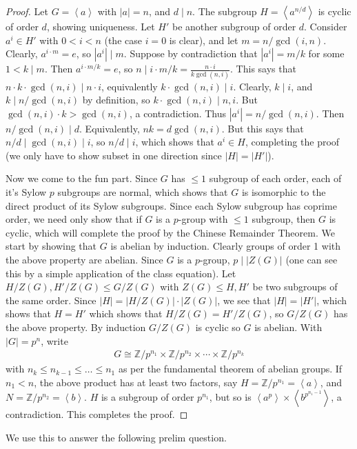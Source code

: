 \documentclass[12pt]{article}
\theoremstyle{definitionstyle}
\def\mbb#1{\mathbb{#1}}
\newcommand{\Z}{\mbb Z}
\newcommand{\gen}[1]{\left\langle #1 \right\rangle}
\begin{document}
	\begin{proof}
		Let $G = \gen{a}$ with $|a| = n$, and $d \mid n$. The subgroup $H = \gen{a^{n/d}}$ is cyclic of order $d$, showing uniqueness. Let $H'$ be another subgroup of order $d$. Consider $a^i \in H'$ with $0 < i < n$ (the case $i=0$ is clear), and let $m = n/\gcd(i,n)$. Clearly, $a^{i \cdot m} = e$, so $|a^i| \mid m$. Suppose by contradiction that $|a^i| = m/k$ for some $1 < k \mid m$. Then $a^{i \cdot m/k} = e$, so $n \mid i \cdot m/k = \frac{n \cdot i}{k \gcd(n, i)}$. This says that $n \cdot k \cdot \gcd(n, i) \mid n \cdot i$, equivalently $k \cdot \gcd(n, i) \mid i$. Clearly, $k \mid i$, and $k \mid n/\gcd(n, i)$ by definition, so $k \cdot \gcd(n, i) \mid n, i$. But $\gcd(n, i) \cdot k > \gcd(n, i)$, a contradiction. Thus $|a^i| = n/\gcd(n, i)$. Then $n/\gcd(n, i) \mid d$. Equivalently, $nk = d\gcd(n, i)$. But this says that $n/d \mid \gcd(n, i) \mid i$, so $n/d \mid i$, which shows that $a^i \in H$, completing the proof (we only have to show subset in one direction since $|H| = |H'|$).
		
		Now we come to the fun part. Since $G$ has $\leq 1$ subgroup of each order, each of it's Sylow $p$ subgroups are normal, which shows that $G$ is isomorphic to the direct product of its Sylow subgroups. Since each Sylow subgroup has coprime order, we need only show that if $G$ is a $p$-group with $\leq 1$ subgroup, then $G$ is cyclic, which will complete the proof by the Chinese Remainder Theorem. We start by showing that $G$ is abelian by induction. Clearly groups of order 1 with the above property are abelian. Since $G$ is a $p$-group, $p \mid |Z(G)|$ (one can see this by a simple application of the class equation). Let $H/Z(G), H'/Z(G) \leq G/Z(G)$ with $Z(G) \leq H, H'$ be two subgroups of the same order. Since $|H| = |H/Z(G)| \cdot |Z(G)|$, we see that $|H| = |H'|$, which shows that $H = H'$ which shows that $H/Z(G) = H'/Z(G)$, so $G/Z(G)$ has the above property. By induction $G/Z(G)$ is cyclic so $G$ is abelian. With $|G| = p^n$, write
		\begin{align*}
			G \cong \Z/p^{n_1} \times \Z/p^{n_2} \times \cdots \times \Z/p^{n_k}
		\end{align*}
		with $n_k \leq n_{k-1} \leq \ldots \leq n_1$ as per the fundamental theorem of abelian groups. If $n_1 < n$, the above product has at least two factors, say $H = \Z/p^{n_1} = \gen{a}$, and $N = \Z/p^{n_2} = \gen{b}$. $H$ is a subgroup of order $p^{n_1}$, but so is $\gen{a^p} \times \gen{b^{p^{n_1-1}}}$, a contradiction. This completes the proof.
	\end{proof}
	We use this to answer the following prelim question.
	
\end{document}
